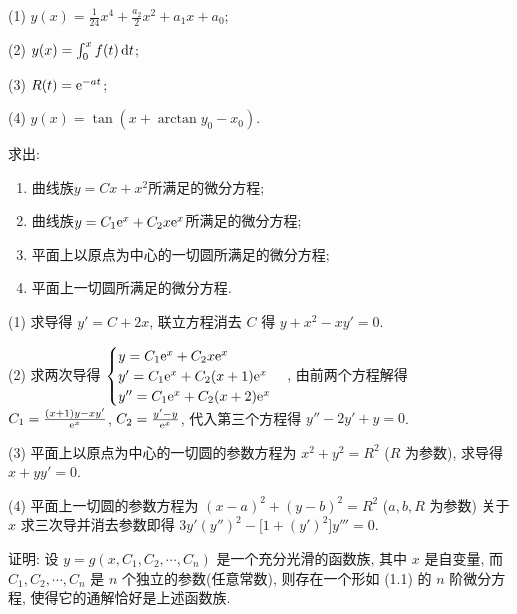 \begin{solution}
  (1) $y(x)=\frac{1}{24}x^4+\frac{a_2}{2}x^2+a_1x+a_0$;

  (2) $y(x)=\int_0^xf(t)\mathop{}\!\mathrm{d} t$;

  (3) $R(t)=\mathrm{e}^{-at}$;

  (4) $y(x)=\tan(x+\arctan y_0-x_0)$.
\end{solution}



\begin{exercise}
  求出:
  \begin{enumerate}[(1)]
  \item 曲线族$y=Cx+x^2$所满足的微分方程;
  \item 曲线族$y=C_1\mathrm{e}^x+C_2x\mathrm{e}^x$所满足的微分方程;
  \item 平面上以原点为中心的一切圆所满足的微分方程;
  \item 平面上一切圆所满足的微分方程.
  \end{enumerate}
\end{exercise}

\begin{solution}
  (1) 求导得 $y'=C+2x$, 联立方程消去 $C$ 得 $y+x^2-xy'=0$.

  (2) 求两次导得
  $\begin{cases}y=C_1\mathrm{e}^x+C_2x\mathrm{e}^x\\y'=C_1\mathrm{e}^x+C_2(x+1)\mathrm{e}^x\\y''=C_1\mathrm{e}^x+C_2(x+2)\mathrm{e}^x\end{cases}$, 
  由前两个方程解得 $C_1=\frac{(x+1)y-xy'}{\mathrm{e}^x}$, $C_2=\frac{y'-y}{\mathrm{e}^x}$, 
  代入第三个方程得 $y''-2y'+y=0$.

  (3) 平面上以原点为中心的一切圆的参数方程为 $x^2+y^2=R^2$ ($R$ 为参数), 求导得 $x+yy'=0$.

  (4) 平面上一切圆的参数方程为 $(x-a)^2+(y-b)^2=R^2$ ($a,b,R$ 为参数)
  关于 $x$ 求三次导并消去参数即得 $3y'(y'')^2-\bigl[1+(y')^2\bigr]y'''=0$.
\end{solution}



\begin{exercise}
证明: 设 $y=g(x,C_1,C_2,\cdots,C_n)$ 是一个充分光滑的函数族, 其中 $x$ 是自变量, 
而 $C_1, C_2, \cdots, C_n$ 是 $n$ 个独立的参数(任意常数), 则存在一个形如 (1.1) 的 $n$ 阶微分方程, 
使得它的通解恰好是上述函数族.
\end{exercise}

